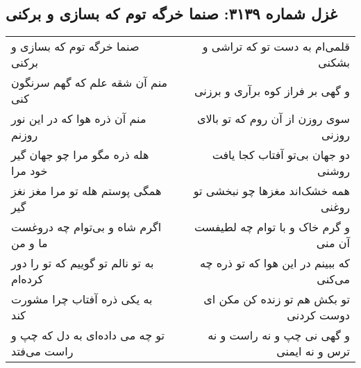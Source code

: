 \begin{center}
\section*{غزل شماره ۳۱۳۹: صنما خرگه توم که بسازی و برکنی}
\label{sec:3139}
\begin{longtable}{l p{0.5cm} r}
صنما خرگه توم که بسازی و برکنی
&&
قلمی‌ام به دست تو که تراشی و بشکنی
\\
منم آن شقه علم که گهم سرنگون کنی
&&
و گهی بر فراز کوه برآری و برزنی
\\
منم آن ذره هوا که در این نور روزنم
&&
سوی روزن از آن روم که تو بالای روزنی
\\
هله ذره مگو مرا چو جهان گیر خود مرا
&&
دو جهان بی‌تو آفتاب کجا یافت روشنی
\\
همگی پوستم هله تو مرا مغز نغز گیر
&&
همه خشک‌اند مغزها چو نبخشی تو روغنی
\\
اگرم شاه و بی‌توام چه دروغست ما و من
&&
و گرم خاک و با توام چه لطیفست آن منی
\\
به تو نالم تو گوییم که تو را دور کرده‌ام
&&
که ببینم در این هوا که تو ذره چه می‌کنی
\\
به یکی ذره آفتاب چرا مشورت کند
&&
تو بکش هم تو زنده کن مکن ای دوست کردنی
\\
تو چه می داده‌ای به دل که چپ و راست می‌فتد
&&
و گهی نی چپ و نه راست و نه ترس و نه ایمنی
\\
\end{longtable}
\end{center}
